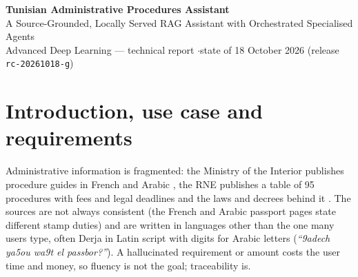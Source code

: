 \documentclass[10pt,a4paper]{article}
\newcommand{\code}[1]{\texttt{\small #1}}
\begin{document}
\begin{center}
  {\LARGE\bfseries Tunisian Administrative Procedures Assistant}\\[3pt]
  {\large A Source-Grounded, Locally Served RAG Assistant with Orchestrated Specialised Agents}\\[4pt]
  {\small Advanced Deep Learning --- technical report \quad$\cdot$\quad state of 18 October 2026 (release \code{rc-20261018-g})}
\end{center}
\vspace{-4pt}

\begin{abstract}
\noindent Citizens who prepare a Tunisian passport, national identity card (CIN) or company registration must
combine French and Arabic pages of several ministries and the National Business Register (RNE), while many of
them write in Tunisian Derja. A general-purpose chatbot can answer fluently yet invent fees, deadlines or legal
provisions. We built a Telegram assistant that answers in French, Arabic, English and Derja (Arabic and Latin
script) only from a registry of official sources, with citations copied from stored provenance. An n8n workflow
orchestrates a FastAPI backend whose services are mostly deterministic (routing rules, hybrid BM25 and BGE-M3
retrieval with reciprocal rank fusion, verbatim checklist and legal-article extraction, form recognition); a
locally served Mistral~7B model generates text only where no deterministic method exists, and its output is
validated. The deployed release recognises four official forms. In production, the automated suites passed
(e.g.\ 30/30 Phase~F+G session turns and 60/60 coverage turns, Telegram mocked); in isolated evaluation, hybrid
retrieval reached Hit@5 0.873 on 71 labelled development questions but only 0.750 on 16 held-out ones. The
latest release has not yet been tested manually in Telegram.
\end{abstract}

\section{Introduction, use case and requirements}\label{sec:intro}
Administrative information is fragmented: the Ministry of the Interior publishes procedure guides in French
and Arabic \cite{interior_passport}, the RNE publishes a table of 95 procedures with fees and legal deadlines
\cite{rne_formalities} and the laws and decrees behind it \cite{law2018_52,decree2022_298}. The sources are not
always consistent (the French and Arabic passport pages state different stamp duties) and are written in
languages other than the one many users type, often Derja in Latin script with digits for Arabic letters
(\emph{``9adech ya5ou wa9t el passbor?''}). A hallucinated requirement or amount \cite{ji2023hallucination}
costs the user time and money, so fluency is not the goal; traceability is.
\end{document}
